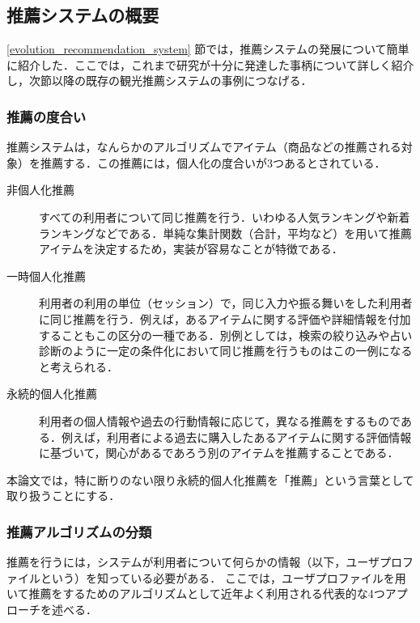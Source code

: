 \documentclass{jsarticle}
\begin{document}
\newpage
\subsection{推薦システムの概要}

\ref{evolution_recommendation_system} 節では，推薦システムの発展について簡単に紹介した．ここでは，これまで研究が十分に発達した事柄について詳しく紹介し，次節以降の既存の観光推薦システムの事例につなげる．

\subsubsection{推薦の度合い}

推薦システムは，なんらかのアルゴリズムでアイテム（商品などの推薦される対象）を推薦する．この推薦には，個人化の度合いが3つあるとされている\cite{define_of_recommendation_system}\cite{recommendation_type_of_personalize}．

\begin{description}
\item[非個人化推薦] すべての利用者について同じ推薦を行う．いわゆる人気ランキングや新着ランキングなどである．単純な集計関数（合計，平均など）を用いて推薦アイテムを決定するため，実装が容易なことが特徴である．
\item[一時個人化推薦] 利用者の利用の単位（セッション）で，同じ入力や振る舞いをした利用者に同じ推薦を行う．例えば，あるアイテムに関する評価や詳細情報を付加することもこの区分の一種である．別例としては，検索の絞り込みや占い診断のように一定の条件化において同じ推薦を行うものはこの一例になると考えられる．
\item[永続的個人化推薦] 利用者の個人情報や過去の行動情報に応じて，異なる推薦をするものである．例えば，利用者による過去に購入したあるアイテムに関する評価情報に基づいて，関心があるであろう別のアイテムを推薦することである．
\end{description}

本論文では，特に断りのない限り永続的個人化推薦を「推薦」という言葉として取り扱うことにする．

\subsubsection{推薦アルゴリズムの分類}

推薦を行うには，システムが利用者について何らかの情報（以下，ユーザプロファイルという）を知っている必要がある．
ここでは，ユーザプロファイルを用いて推薦をするためのアルゴリズムとして近年よく利用される代表的な4つアプローチを述べる．
\end{document}
